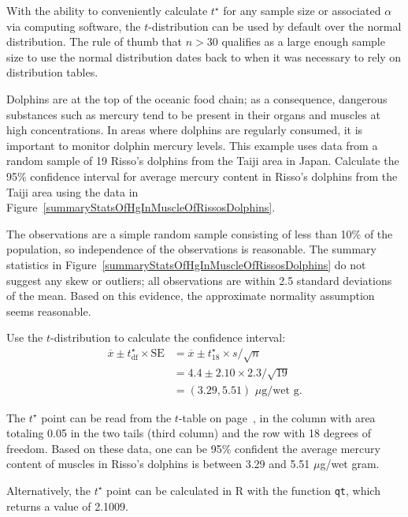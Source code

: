 With the ability to conveniently calculate $t^\star$ for any sample size or associated $\alpha$ via computing software, the $t$-distribution can be used by default over the normal distribution. The rule of thumb that $n > 30$ qualifies as a large enough sample size to use the normal distribution dates back to when it was necessary to rely on distribution tables.

\begin{examplewrap}
\begin{nexample}{Dolphins are at the top of the oceanic food chain; as a consequence, dangerous substances such as mercury tend to be present in their organs and muscles at high concentrations. In areas where dolphins are regularly consumed, it is important to monitor dolphin mercury levels. This example uses data from a random sample of 19 Risso's dolphins from the Taiji area in Japan.\footnotemark{} Calculate the 95\% confidence interval for average mercury content in Risso's dolphins from the Taiji area using the data in Figure~\ref{summaryStatsOfHgInMuscleOfRissosDolphins}.}

The observations are a simple random sample consisting of less than 10\% of the population, so independence of the observations is reasonable. The summary statistics in Figure~\ref{summaryStatsOfHgInMuscleOfRissosDolphins} do not suggest any skew or outliers; all observations are within 2.5 standard deviations of the mean. Based on this evidence, the approximate normality assumption seems reasonable.

Use the $t$-distribution to calculate the confidence interval:
\begin{align*}
\overline{x} \pm  t^{\star}_{\text{df}} \times \text{SE} &= \overline{x}  \pm  t^{\star}_{18}  \times s/\sqrt{n} \\
&= 4.4 \pm  2.10 \times 2.3/\sqrt{19} \\
&= (3.29, 5.51)\,\, \mu\text{g/wet g}.
\end{align*}

The $t^{\star}$ point can be read from the $t$-table on page~\pageref{tTableSample}, in the column with area totaling 0.05 in the two tails (third column) and the row with 18 degrees of freedom. Based on these data, one can be 95\% confident the average mercury content of muscles in Risso's dolphins is between 3.29 and 5.51 $\mu$g/wet gram.

Alternatively, the $t^\star$ point can be calculated in \textsf{R} with the function \texttt{qt}, which returns a value of 2.1009.
\end{nexample}
\end{examplewrap}

